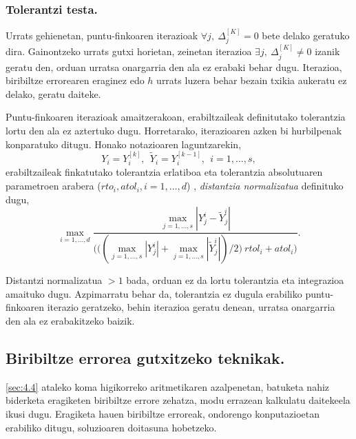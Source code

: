 \subsubsection*{Tolerantzi testa.}

Urrats gehienetan, puntu-finkoaren iterazioak $\forall j, \ \Delta_{j}^{[K]}=0$ bete delako geratuko dira. Gainontzeko urrats gutxi horietan, zeinetan iterazioa $\exists j,  \ \Delta_{j}^{[K]} \neq 0$ izanik geratu den, orduan  urratsa onargarria den ala ez erabaki behar dugu. Iterazioa, biribiltze errorearen eraginez edo $h$ urrats luzera  behar bezain txikia aukeratu ez delako, geratu daiteke.

Puntu-finkoaren iterazioak amaitzerakoan, erabiltzaileak definitutako tolerantzia lortu den ala ez aztertuko dugu. Horretarako, iterazioaren azken bi hurbilpenak konparatuko ditugu. Honako notazioaren laguntzarekin,
\begin{equation*}
Y_i=Y_i^{[k]}, \ \ \tilde{Y}_i=Y_i^{[k-1]}, \ \ i=1,\dots,s,
\end{equation*}  
erabiltzaileak finkatutako tolerantzia erlatiboa eta tolerantzia absolutuaren parametroen arabera ($rto_i,atol_i, i=1,\dots,d$) , \emph{distantzia normalizatua} definituko dugu,
\begin{equation*}
\max_{i=1,\dots,d} \frac{\max_{j=1,\dots,s} |Y_j^i-\tilde{Y}_j^i|}
                        {\bigg(\big((\max_{j=1,\dots,s} |Y_j^i|+\max_{j=1,\dots,s} |\tilde{Y}_j^i|)/2 \big) \ rtol_i+ atol_i \bigg)}.
\end{equation*}

Distantzi normalizatua $>1$ bada, orduan ez da lortu tolerantzia eta integrazioa amaituko dugu.
Azpimarratu behar da, tolerantzia ez dugula erabiliko puntu-finkoaren iterazio geratzeko, behin iterazioa geratu denean, urratsa onargarria den ala ez erabakitzeko baizik.

\subsection{Biribiltze errorea gutxitzeko teknikak.}

\ref{sec:4.4} ataleko koma higikorreko aritmetikaren azalpenetan, batuketa nahiz biderketa eragiketen biribiltze errore zehatza, modu errazean kalkulatu daitekeela ikusi dugu. Eragiketa hauen biribiltze erroreak, ondorengo konputazioetan erabiliko ditugu, soluzioaren doitasuna hobetzeko.

